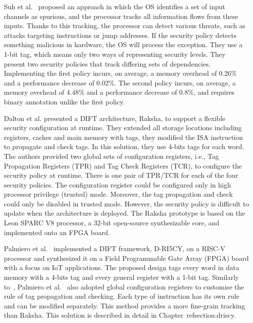 Suh et al.~\cite{SLD-04-sigplan} proposed an approach in which the OS identifies a set of input channels as spurious, and the processor tracks all information flows from these inputs. Thanks to this tracking, the processor can detect various threats, such as attacks targeting instructions or jump addresses. If the security policy detects something malicious in hardware, the OS will process the exception. They use a 1-bit tag, which means only two ways of representing security levels. They present two security policies that track differing sets of dependencies. Implementing the first policy incurs, on average, a memory overhead of 0.26\% and a performance decrease of 0.02\%. The second policy incurs, on average, a memory overhead of 4.48\% and a performance decrease of 0.8\%, and requires binary annotation unlike the first policy.

Dalton et al.\cite{DKK-07-sigarch} presented a DIFT architecture, Raksha, to support a flexible security configuration at runtime. They extended all storage locations including registers, caches and main memory with tags, they modified the ISA instruction to propagate and check tags. In this solution, they use 4-bits tags for each word.
The authors provided two global sets of configuration registers, i.e., Tag Propagation Registers (TPR) and Tag Check Registers (TCR), to configure the security policy at runtime. There is one pair of TPR/TCR for each of the four security policies. The configuration register could be configured only in high processor privilege (trusted) mode. Moreover, the tag propagation and check could only be disabled in trusted mode. However, the security policy is difficult to update when the architecture is deployed.
The Raksha prototype is based on the Leon SPARC V8 processor, a 32-bit open-source synthesizable core, and implemented onto an FPGA board.

Palmiero et al.~\cite{PDGLC-18-hpec} implemented a DIFT framework, D-RI5CY, on a RISC-V processor and synthesized it on a Field Programmable Gate Array (FPGA) board with a focus on IoT applications. The proposed design tags every word in data memory with a 4-bits tag and every general register with a 1-bit tag. Similarly to~\cite{DKK-07-sigarch}, Palmiero et al.~\cite{PDGLC-18-hpec} also adopted global configuration registers to customise the rule of tag propagation and checking. Each type of instruction has its own rule and can be modified separately. This method provides a more fine-grain tracking than Raksha. This solution is described in detail in Chapter~ref{section:driscy}.

